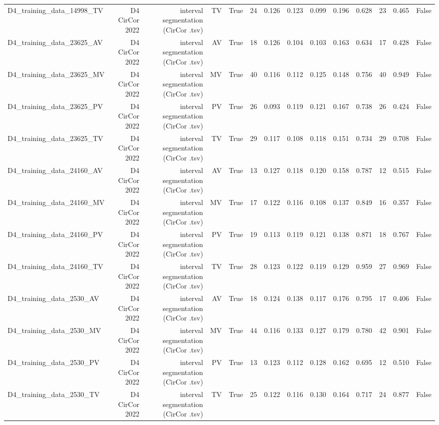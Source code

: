 \begin{table}[htbp]
\begin{tabular}{lrrrrrrrrrrrrr}
    D4\_training\_data\_14998\_TV & D4 CirCor 2022 & interval segmentation (CirCor .tsv) & TV & True & 24 & 0.126 & 0.123 & 0.099 & 0.196 & 0.628 & 23 & 0.465 & False \\
    D4\_training\_data\_23625\_AV & D4 CirCor 2022 & interval segmentation (CirCor .tsv) & AV & True & 18 & 0.126 & 0.104 & 0.103 & 0.163 & 0.634 & 17 & 0.428 & False \\
    D4\_training\_data\_23625\_MV & D4 CirCor 2022 & interval segmentation (CirCor .tsv) & MV & True & 40 & 0.116 & 0.112 & 0.125 & 0.148 & 0.756 & 40 & 0.949 & False \\
    D4\_training\_data\_23625\_PV & D4 CirCor 2022 & interval segmentation (CirCor .tsv) & PV & True & 26 & 0.093 & 0.119 & 0.121 & 0.167 & 0.738 & 26 & 0.424 & False \\
    D4\_training\_data\_23625\_TV & D4 CirCor 2022 & interval segmentation (CirCor .tsv) & TV & True & 29 & 0.117 & 0.108 & 0.118 & 0.151 & 0.734 & 29 & 0.708 & False \\
    D4\_training\_data\_24160\_AV & D4 CirCor 2022 & interval segmentation (CirCor .tsv) & AV & True & 13 & 0.127 & 0.118 & 0.120 & 0.158 & 0.787 & 12 & 0.515 & False \\
    D4\_training\_data\_24160\_MV & D4 CirCor 2022 & interval segmentation (CirCor .tsv) & MV & True & 17 & 0.122 & 0.116 & 0.108 & 0.137 & 0.849 & 16 & 0.357 & False \\
    D4\_training\_data\_24160\_PV & D4 CirCor 2022 & interval segmentation (CirCor .tsv) & PV & True & 19 & 0.113 & 0.119 & 0.121 & 0.138 & 0.871 & 18 & 0.767 & False \\
    D4\_training\_data\_24160\_TV & D4 CirCor 2022 & interval segmentation (CirCor .tsv) & TV & True & 28 & 0.123 & 0.122 & 0.119 & 0.129 & 0.959 & 27 & 0.969 & False \\
    D4\_training\_data\_2530\_AV & D4 CirCor 2022 & interval segmentation (CirCor .tsv) & AV & True & 18 & 0.124 & 0.138 & 0.117 & 0.176 & 0.795 & 17 & 0.406 & False \\
    D4\_training\_data\_2530\_MV & D4 CirCor 2022 & interval segmentation (CirCor .tsv) & MV & True & 44 & 0.116 & 0.133 & 0.127 & 0.179 & 0.780 & 42 & 0.901 & False \\
    D4\_training\_data\_2530\_PV & D4 CirCor 2022 & interval segmentation (CirCor .tsv) & PV & True & 13 & 0.123 & 0.112 & 0.128 & 0.162 & 0.695 & 12 & 0.510 & False \\
    D4\_training\_data\_2530\_TV & D4 CirCor 2022 & interval segmentation (CirCor .tsv) & TV & True & 25 & 0.122 & 0.116 & 0.130 & 0.164 & 0.717 & 24 & 0.877 & False \\

\end{tabular}
\end{table}
